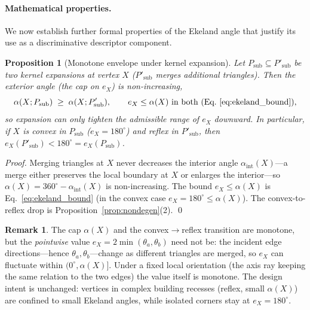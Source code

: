 \documentclass[10pt]{article}
\theoremstyle{plain}
\newtheorem{proposition}[theorem]{Proposition}
\theoremstyle{definition}
\newtheorem{remark}[theorem]{Remark}
\begin{document}
\paragraph{Mathematical properties.}

We now establish further formal properties of the Ekeland angle that justify
its use as a discriminative descriptor component.

\begin{proposition}[Monotone envelope under kernel expansion]
\label{prop:monotone}
Let $P_{\mathrm{sub}} \subseteq P'_{\mathrm{sub}}$ be two kernel expansions at
vertex $X$ ($P'_{\mathrm{sub}}$ merges additional triangles). Then the exterior
angle (the cap on $e_X$) is non-increasing,
\[
  \alpha(X;P_{\mathrm{sub}})\;\ge\;\alpha(X;P'_{\mathrm{sub}}),
  \qquad e_X\le\alpha(X)\ \text{in both (Eq.~\eqref{eq:ekeland_bound}),}
\]
so expansion can only tighten the admissible range of $e_X$ downward.
In particular, if $X$ is convex in $P_{\mathrm{sub}}$ ($e_X=180^\circ$) and
reflex in $P'_{\mathrm{sub}}$, then
$e_X(P'_{\mathrm{sub}})<180^\circ=e_X(P_{\mathrm{sub}})$.
\end{proposition}
\begin{proof}
Merging triangles at $X$ never decreases the interior angle
$\alpha_{\mathrm{int}}(X)$---a merge either preserves the local boundary at $X$
or enlarges the interior---so $\alpha(X)=360^\circ-\alpha_{\mathrm{int}}(X)$ is
non-increasing. The bound $e_X\le\alpha(X)$ is Eq.~\eqref{eq:ekeland_bound}
(in the convex case $e_X=180^\circ\le\alpha(X)$). The convex-to-reflex drop is
Proposition~\ref{prop:nondegen}(2). \qed
\end{proof}

\begin{remark}
The cap $\alpha(X)$ and the convex$\to$reflex transition are monotone, but the
\emph{pointwise} value $e_X=2\min(\theta_a,\theta_b)$ need not be: the incident
edge directions---hence $\theta_a,\theta_b$---change as different triangles are
merged, so $e_X$ can fluctuate within $(0^\circ,\alpha(X)]$. Under a fixed local
orientation (the axis ray keeping the same relation to the two edges) the value
itself is monotone. The design intent is unchanged: vertices in complex building
recesses (reflex, small $\alpha(X)$) are confined to small Ekeland angles, while
isolated corners stay at $e_X=180^\circ$.
\end{remark}
\end{document}
